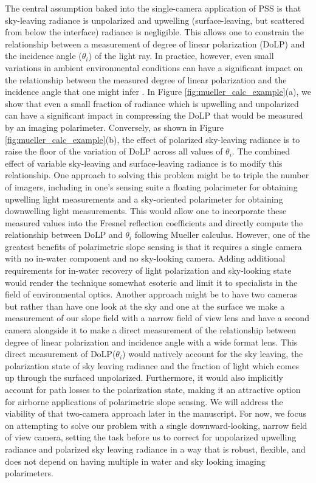 \documentclass[letterpaper,journal]{IEEEtran}
\begin{document}
The central assumption baked into the single-camera application of PSS is that sky-leaving radiance is unpolarized and upwelling (surface-leaving, but scattered from below the interface) radiance is negligible. This allows one to constrain the relationship between a measurement of degree of linear polarization (DoLP) and the incidence angle ($\theta_i$) of the light ray. In practice, however, even small variations in ambient environmental conditions can have a significant impact on the relationship between the measured degree of linear polarization and the incidence angle that one might infer \cite{goldstein_polarized_2017,voss_polarized_1997}. In Figure \ref{fig:mueller_calc_example}(a), we show that even a small fraction of radiance which is upwelling and unpolarized can have a significant impact in compressing the DoLP that would be measured by an imaging polarimeter. Conversely, as shown in Figure \ref{fig:mueller_calc_example}(b), the effect of polarized sky-leaving radiance is to raise the floor of the variation of DoLP across all values of $\theta_i$. The combined effect of variable sky-leaving and surface-leaving radiance is to modify this relationship. One approach to solving this problem might be to triple the number of imagers, including in one's sensing suite a floating polarimeter for obtaining upwelling light measurements and a sky-oriented polarimeter for obtaining downwelling light measurements. This would allow one to incorporate these measured values into the Fresnel reflection coefficients and directly compute the relationship between DoLP and $\theta_i$ following Mueller calculus. However, one of the greatest benefits of polarimetric slope sensing is that it requires a single camera with no in-water component and no sky-looking camera. Adding additional requirements for in-water recovery of light polarization and sky-looking state would render the technique somewhat esoteric and limit it to specialists in the field of environmental optics. Another approach might be to have two cameras but rather than have one look at the sky and one at the surface we make a measurement of our slope field with a narrow field of view lens and have a second camera alongside it to make a direct measurement of the relationship between degree of linear polarization and incidence angle with a wide format lens. This direct measurement of DoLP($\theta_i$) would natively account for the sky leaving, the polarization state of sky leaving radiance and the fraction of light which comes up through the surfaced unpolarized. Furthermore, it would also implicitly account for path losses to the polarization state, making it an attractive option for airborne applications of polarimetric slope sensing. We will address the viability of that two-camera approach later in the manuscript. For now, we focus on attempting to solve our problem with a single downward-looking, narrow field of view camera, setting the task before us to correct for unpolarized upwelling radiance and polarized sky leaving radiance in a way that is robust, flexible, and does not depend on having multiple in water and sky looking imaging polarimeters.
\end{document}

